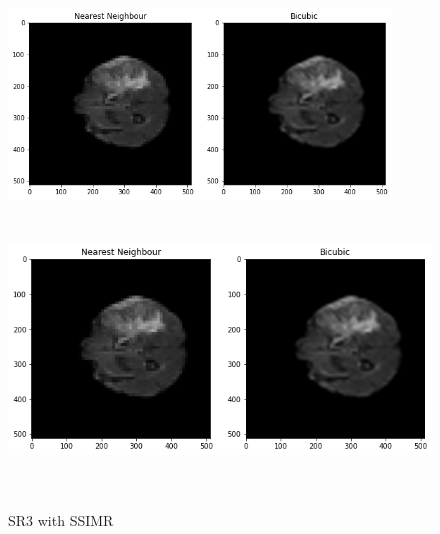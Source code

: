 \begin{figure}[!htbp]
  \begin{center}
    \leavevmode
    \ifpdf
      \includegraphics[height=2in]{Chapter4/images/sr3-res2.png}
    \else
      \includegraphics[bb = 92 86 545 742, height=3in]{Chapter4/images/sr3-res2.png}
    \fi
    \caption{SR3 with SSIMR}
    \label{Result SR3 - SSIMR}
  \end{center}
\end{figure}







